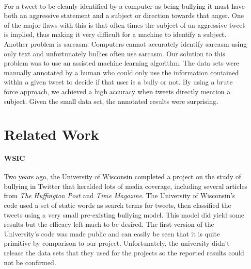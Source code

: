 \documentclass[11pt,letterpaper]{article}
\begin{document}
\paragraph{}
For a tweet to be cleanly identified by a computer as being bullying it must have both an aggressive statement and a subject or direction towards that anger. One of the major flaws with this is that often times the subject of an aggressive tweet is implied, thus making it very difficult for a machine to identify a subject. Another problem is sarcasm. Computers cannot accurately identify sarcasm using only text and unfortunately bullies often use sarcasm. Our solution to this problem was to use an assisted machine learning algorithm. The data sets were manually annotated by a human who could only use the information contained within a given tweet to decide if that user is a bully or not. By using a brute force approach, we achieved a high accuracy when tweets directly mention a subject. Given the small data set, the annotated results were surprising.


\section{Related Work}
\paragraph{WSIC}
Two years ago, the University of Wisconsin completed a project on the study of bullying in Twitter that heralded lots of media coverage, including several articles from \textit{The Huffington Post} and \textit{Time Magazine}. The University of Wisconsin's code used a set of static words as search terms for tweets, then classified the tweets using a very small pre-existing bullying model. This model did yield some results but the efficacy left much to be desired. The first version of the University's code was made public and can easily be seen that it is quite primitive by comparison to our project. Unfortunately, the university didn’t release the data sets that they used for the projects so the reported results could not be confirmed.
\end{document}

